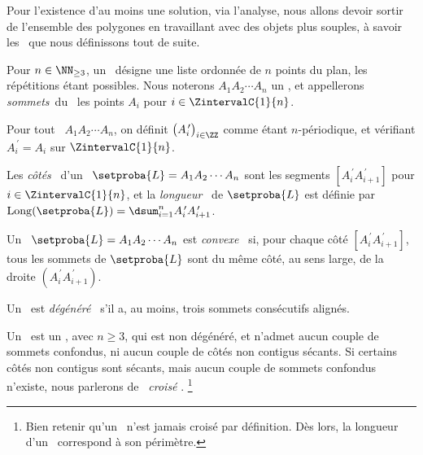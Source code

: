Pour l'existence d'au moins une solution, via l'analyse, nous allons devoir sortir de l'ensemble des polygones en travaillant avec des objets plus souples, à savoir les \ncycles\ que nous définissons tout de suite.




\begin{defi}
	Pour $n \in \NN_{\geq3}$, un \og \emph{\ncycle} \fg\ désigne une liste ordonnée de $n$ points du plan, les répétitions étant possibles.
	Nous noterons $A_1 A_2 \cdots A_n$ un \ncycle, et appellerons \og \emph{sommets}\fg\ du \ncycle\ les points $A_i$ pour $i \in \ZintervalC{1}{n}$.
\end{defi}


\begin{defi}
    Pour tout \ncycle\ $A_1 A_2 \cdots A_n$, on définit $\big( A^{\,\prime}_i \big)_{i \in \ZZ}$ comme étant $n$-périodique, et vérifiant $A^{\,\prime}_{i} = A_i$ sur $\ZintervalC{1}{n}$.
\end{defi}


\begin{defi}
	Les \og \emph{côtés} \fg\ d'un \ncycle\ $\setproba{L} = A_1 A_2 \cdots A_n$ sont les segments
	$[A^{\,\prime}_i A^{\,\prime}_{i+1}]$ pour $i \in \ZintervalC{1}{n}$,
	et
	la \og \emph{longueur} \fg\ de $\setproba{L}$ est définie par $\cyclelen{\setproba{L}} = \dsum_{i=1}^{n} A^{\,\prime}_i A^{\,\prime}_{i+1}$.
\end{defi}


\begin{defi}
	Un \ncycle\ $\setproba{L} = A_1 A_2 \cdots A_n$ est \og \emph{convexe} \fg\ si, pour chaque côté $[A^{\,\prime}_i A^{\,\prime}_{i+1}]$, tous les sommets de $\setproba{L}$ sont du même côté, au sens large, de la droite $(A^{\,\prime}_i A^{\,\prime}_{i+1})$.
\end{defi}




\begin{defi}
	Un \ncycle\ est \og \emph{dégénéré} \fg\ s'il a, au moins, trois sommets consécutifs alignés.
\end{defi}




\begin{defi}
	Un \og \emph{\ngone} \fg\ est un \ncycle, avec  $n \geq 3$, qui est non dégénéré, et n'admet aucun couple de sommets confondus, ni aucun couple de côtés non contigus sécants.
	Si certains côtés non contigus sont sécants, mais aucun couple de sommets confondus n'existe, nous parlerons de \og \emph{\ngone\ croisé} \fg.%
	\footnote{
		Bien retenir qu'un \ngone\ n'est jamais croisé par définition.
		Dès lors, la longueur d'un \ngone\ correspond à son périmètre.
	}
\end{defi}


